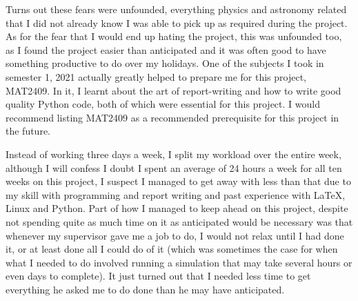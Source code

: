 \documentclass[12pt,a4paper,openright]{article}
\begin{document}
Turns out these fears were unfounded, everything physics and astronomy related that I did not already know I was able to pick up as required during the project. As for the fear that I would end up hating the project, this was unfounded too, as I found the project easier than anticipated and it was often good to have something productive to do over my holidays. One of the subjects I took in semester 1, 2021 actually greatly helped to prepare me for this project, MAT2409. In it, I learnt about the art of report-writing and how to write good quality Python code, both of which were essential for this project. I would recommend listing MAT2409 as a recommended prerequisite for this project in the future. 

Instead of working three days a week, I split my workload over the entire week, although I will confess I doubt I spent an average of 24 hours a week for all ten weeks on this project, I suspect I managed to get away with less than that due to my skill with programming and report writing and past experience with LaTeX, Linux and Python. Part of how I managed to keep ahead on this project, despite not spending quite as much time on it as anticipated would be necessary was that whenever my supervisor gave me a job to do, I would not relax until I had done it, or at least done all I could do of it (which was sometimes the case for when what I needed to do involved running a simulation that may take several hours or even days to complete). It just turned out that I needed less time to get everything he asked me to do done than he may have anticipated. 
\end{document}
